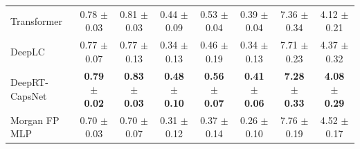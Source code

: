 \begin{table}[htbp]
\begin{tabular}{lccccccc}
    Transformer & 0.78 $\pm$ 0.03 & 0.81 $\pm$ 0.03 & 0.44 $\pm$ 0.09 & 0.53 $\pm$ 0.04 & 0.39 $\pm$ 0.04 & 7.36 $\pm$ 0.34 & 4.12 $\pm$ 0.21 \\
    DeepLC & 0.77 $\pm$ 0.07 & 0.77 $\pm$ 0.13 & 0.34 $\pm$ 0.13 & 0.46 $\pm$ 0.19 & 0.34 $\pm$ 0.13 & 7.71 $\pm$ 0.23 & 4.37 $\pm$ 0.32 \\
    DeepRT-CapsNet & \textbf{0.79 $\pm$ 0.02} & \textbf{0.83 $\pm$ 0.03} & \textbf{0.48 $\pm$ 0.10} & \textbf{0.56 $\pm$ 0.07} & \textbf{0.41 $\pm$ 0.06} & \textbf{7.28 $\pm$ 0.33} & \textbf{4.08 $\pm$ 0.29} \\
    Morgan FP MLP & 0.70 $\pm$ 0.03 & 0.70 $\pm$ 0.07 & 0.31 $\pm$ 0.12 & 0.37 $\pm$ 0.14 & 0.26 $\pm$ 0.10 & 7.76 $\pm$ 0.19 & 4.52 $\pm$ 0.17 \\
    \bottomrule
  \end{tabular}
\end{table}
